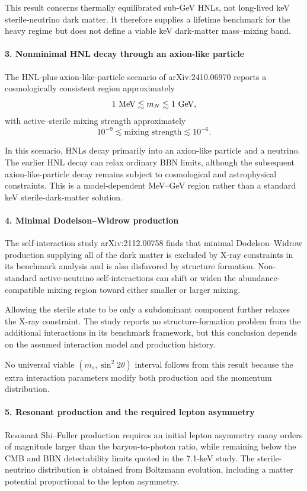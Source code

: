 \documentclass[11pt,a4paper]{article}
\begin{document}
This result concerns thermally equilibrated sub-GeV HNLs, not long-lived keV sterile-neutrino dark matter. It therefore supplies a lifetime benchmark for the heavy regime but does not define a viable keV dark-matter mass--mixing band.

\paragraph{3. Nonminimal HNL decay through an axion-like particle}
The HNL-plus-axion-like-particle scenario of arXiv:2410.06970 reports a cosmologically consistent region approximately \[ 1\ {\rm MeV}\lesssim m_N\lesssim 1\ {\rm GeV}, \] with active--sterile mixing strength approximately \[ 10^{-9}\lesssim \text{mixing strength}\lesssim 10^{-6}. \]

In this scenario, HNLs decay primarily into an axion-like particle and a neutrino. The earlier HNL decay can relax ordinary BBN limits, although the subsequent axion-like-particle decay remains subject to cosmological and astrophysical constraints. This is a model-dependent MeV--GeV region rather than a standard keV sterile-dark-matter solution.

\paragraph{4. Minimal Dodelson--Widrow production}
The self-interaction study arXiv:2112.00758 finds that minimal Dodelson--Widrow production supplying all of the dark matter is excluded by X-ray constraints in its benchmark analysis and is also disfavored by structure formation. Non-standard active-neutrino self-interactions can shift or widen the abundance-compatible mixing region toward either smaller or larger mixing.

Allowing the sterile state to be only a subdominant component further relaxes the X-ray constraint. The study reports no structure-formation problem from the additional interactions in its benchmark framework, but this conclusion depends on the assumed interaction model and production history.

No universal viable \((m_s,\sin^2 2\theta)\) interval follows from this result because the extra interaction parameters modify both production and the momentum distribution.

\paragraph{5. Resonant production and the required lepton asymmetry}
Resonant Shi--Fuller production requires an initial lepton asymmetry many orders of magnitude larger than the baryon-to-photon ratio, while remaining below the CMB and BBN detectability limits quoted in the 7.1-keV study. The sterile-neutrino distribution is obtained from Boltzmann evolution, including a matter potential proportional to the lepton asymmetry.
\end{document}
